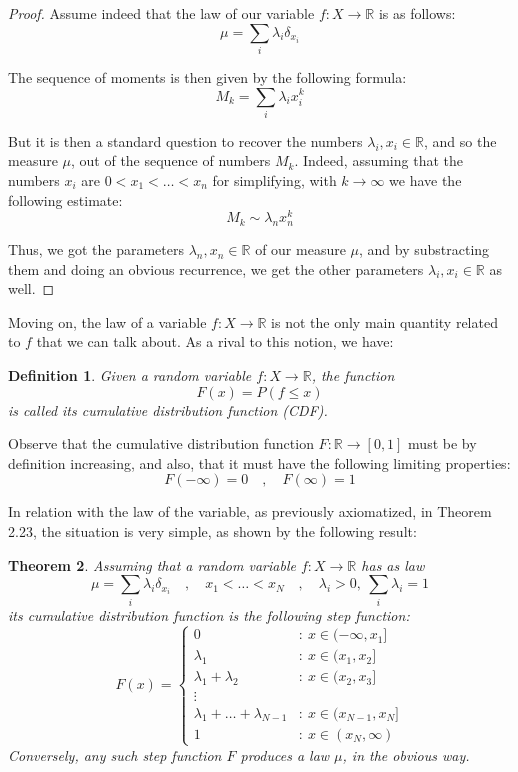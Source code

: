 \documentclass[12pt]{amsbook}
\newtheorem{theorem}{Theorem}[chapter]
\newtheorem{definition}[theorem]{Definition}
\begin{document}
\begin{proof}
Assume indeed that the law of our variable $f:X\to\mathbb R$ is as follows:
$$\mu=\sum_i\lambda_i\delta_{x_i}$$

The sequence of moments is then given by the following formula:
$$M_k=\sum_i\lambda_ix_i^k$$

But it is then a standard question to recover the numbers $\lambda_i,x_i\in\mathbb R$, and so the measure $\mu$, out of the sequence of numbers $M_k$. Indeed, assuming that the numbers $x_i$ are $0<x_1<\ldots<x_n$ for simplifying, with $k\to\infty$ we have the following estimate:
$$M_k\sim\lambda_nx_n^k$$

Thus, we got the parameters $\lambda_n,x_n\in\mathbb R$ of our measure $\mu$, and by substracting them and doing an obvious recurrence, we get the other parameters $\lambda_i,x_i\in\mathbb R$ as well.
\end{proof}

Moving on, the law of a variable $f:X\to\mathbb R$ is not the only main quantity related to $f$ that we can talk about. As a rival to this notion, we have:

\begin{definition}
Given a random variable $f:X\to\mathbb R$, the function
$$F(x)=P(f\leq x)$$
is called its cumulative distribution function (CDF).
\end{definition}

Observe that the cumulative distribution function $F:\mathbb R\to[0,1]$ must be by definition increasing, and also, that it must have the following limiting properties:
$$F(-\infty)=0\quad,\quad F(\infty)=1$$

In relation with the law of the variable, as previously axiomatized, in Theorem 2.23, the situation is very simple, as shown by the following result:

\begin{theorem}
Assuming that a random variable $f:X\to\mathbb R$ has as law 
$$\mu=\sum_i\lambda_i\delta_{x_i}\quad,\quad x_1<\ldots<x_N\quad,\quad\lambda_i>0,\ \sum_i\lambda_i=1$$
its cumulative distribution function is the following step function:
$$F(x)=\begin{cases}
0&:\ x\in(-\infty,x_1]\\
\lambda_1&:\ x\in(x_1,x_2]\\
\lambda_1+\lambda_2&:\ x\in(x_2,x_3]\\
\vdots&\\
\lambda_1+\ldots+\lambda_{N-1}&:\ x\in(x_{N-1},x_N]\\
1&:\ x\in(x_N,\infty)
\end{cases}$$
Conversely, any such step function $F$ produces a law $\mu$, in the obvious way.
\end{theorem}
\end{document}
